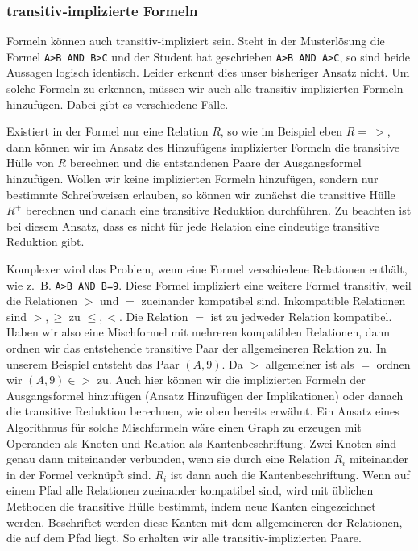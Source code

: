 
\subsubsection{transitiv-implizierte Formeln}

Formeln können auch transitiv-impliziert sein. Steht in der Musterlösung die Formel \verb|A>B AND B>C| und der Student hat geschrieben \verb|A>B AND A>C|, so sind beide Aussagen logisch identisch. Leider erkennt dies unser bisheriger Ansatz nicht. Um solche Formeln zu erkennen, müssen wir auch alle transitiv-implizierten Formeln hinzufügen. Dabei gibt es verschiedene Fälle. 

Existiert in der Formel nur eine Relation $R$, so wie im Beispiel eben $R=\ >$, dann können wir im Ansatz des Hinzufügens implizierter Formeln die transitive Hülle von $R$ berechnen und die entstandenen Paare der Ausgangsformel hinzufügen. Wollen wir keine implizierten Formeln hinzufügen, sondern nur bestimmte Schreibweisen erlauben, so können wir zunächst die transitive Hülle $R^+$ berechnen und danach eine transitive Reduktion durchführen. Zu beachten ist bei diesem Ansatz, dass es nicht für jede Relation eine eindeutige transitive Reduktion gibt. 

Komplexer wird das Problem, wenn eine Formel verschiedene Relationen enthält, wie \mbox{z. B.} \verb|A>B AND B=9|. Diese Formel impliziert eine weitere Formel transitiv, weil die Relationen $>$ und $=$ zueinander kompatibel sind. Inkompatible Relationen sind $>,\geq$ zu $\leq,<$. Die Relation $=$ ist zu jedweder Relation kompatibel. Haben wir also eine Mischformel mit mehreren kompatiblen Relationen, dann ordnen wir das entstehende transitive Paar der allgemeineren Relation zu. In unserem Beispiel entsteht das Paar $(A,9)$. Da $>$ allgemeiner ist als $=$ ordnen wir $(A,9) \in >$ zu. Auch hier können wir die implizierten Formeln der Ausgangsformel hinzufügen (Ansatz Hinzufügen der Implikationen) oder danach die transitive Reduktion berechnen, wie oben bereits erwähnt. Ein Ansatz eines Algorithmus für solche Mischformeln wäre einen Graph zu erzeugen mit Operanden als Knoten und Relation als Kantenbeschriftung. Zwei Knoten sind genau dann miteinander verbunden, wenn sie durch eine Relation $R_i$ miteinander in der Formel verknüpft sind. $R_i$ ist dann auch die Kantenbeschriftung. Wenn auf einem Pfad alle Relationen zueinander kompatibel sind, wird mit üblichen Methoden die transitive Hülle bestimmt, indem neue Kanten eingezeichnet werden. Beschriftet werden diese Kanten mit dem allgemeineren der Relationen, die auf dem Pfad liegt. So erhalten wir alle transitiv-implizierten Paare.

